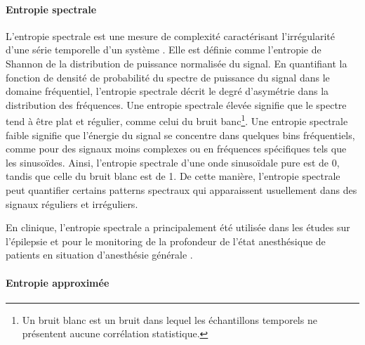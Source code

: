 \paragraph{Entropie spectrale\\}
\label{spen}

L'entropie spectrale est une mesure de complexité caractérisant l'irrégularité d'une série temporelle d'un système \citep{inouye1991quantification}. 
Elle est définie comme l'entropie de Shannon de la distribution de puissance normalisée du signal. 
En quantifiant la fonction de densité de probabilité du spectre de puissance du signal dans le domaine fréquentiel, l'entropie spectrale décrit le degré d’asymétrie dans la distribution des fréquences. 
Une entropie spectrale élevée signifie que le spectre tend à être plat et régulier, comme celui du bruit banc\footnote{Un bruit blanc est un bruit dans lequel les échantillons temporels ne présentent aucune corrélation statistique.}. 
Une entropie spectrale faible signifie que l'énergie du signal se concentre dans quelques bins fréquentiels, comme pour des signaux moins complexes ou en fréquences spécifiques tels que les sinusoïdes. 
Ainsi, l'entropie spectrale d'une onde sinusoïdale pure est de 0, tandis que celle du bruit blanc est de 1. 
De cette manière, l'entropie spectrale peut quantifier certains patterns spectraux qui apparaissent usuellement dans des signaux réguliers et irréguliers. 

En clinique, l'entropie spectrale a principalement été utilisée dans les études sur l'épilepsie \citep{helakari2019spectral, kannathal2005entropies, mirzaei2010eeg, uriguen2017comparison} et pour le monitoring de la profondeur de l'état anesthésique de patients en situation d'anesthésie générale \citep{chhabra2016spectral, ellerkmann2004spectral, jantti2004spectral, klockars2012spectral, liang2015eeg, maksimow2006increase, seitsonen2005eeg, vakkuri2004time, vanluchene2004spectral}. 

\paragraph{Entropie approximée\\}
\label{apen}

